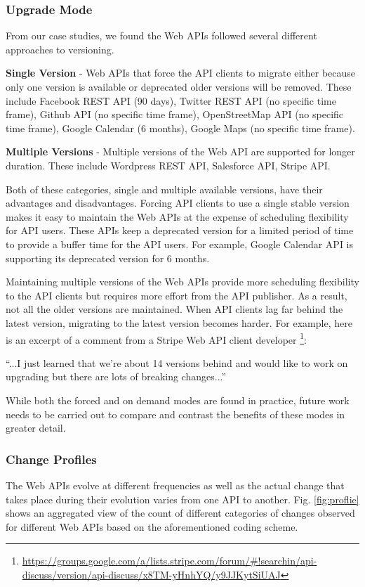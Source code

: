 \subsubsection{Upgrade Mode} %

From our case studies, we found the Web APIs followed several different approaches to versioning.

\textbf{Single Version} - Web APIs that force the API clients to migrate either because only one version is available or deprecated older versions will be removed. These include Facebook REST API (90 days), Twitter REST API (no specific time frame), Github API (no specific time frame), OpenStreetMap API (no specific time frame), Google Calendar (6 months), Google Maps (no specific time frame).

\textbf{Multiple Versions} - Multiple versions of the Web API are supported for longer duration. These include Wordpress REST API, Salesforce API, Stripe API.

Both of these categories, single and multiple available versions, have their advantages and disadvantages. Forcing API clients to use a single stable version makes it easy to maintain the Web APIs at the expense of scheduling flexibility for API users. These APIs keep a deprecated version for a limited period of time to provide a buffer time for the API users. For example, Google Calendar API is supporting its deprecated version for 6 months.

Maintaining multiple versions of the Web APIs provide more scheduling flexibility to the API clients but requires more effort from the API publisher. As a result, not all the older versions are maintained. When API clients lag far behind the latest version, migrating to the latest version becomes harder. For example, here is an excerpt of a comment from a Stripe Web API client developer \footnote{\url{https://groups.google.com/a/lists.stripe.com/forum/\#!searchin/api-discuss/version/api-discuss/x8TM-yHnhYQ/y9JJKytSiUAJ}}:

\small
``...I just learned that we're about 14 versions behind and would like to work on upgrading but there are lots of breaking changes...''
\normalsize

While both the forced and on demand modes are found in practice, future work needs to be carried out to compare and contrast the benefits of these modes in greater detail.




\subsubsection{Change Profiles}
The Web APIs evolve at different frequencies as well as the actual change that takes place during their evolution varies from one API to another. Fig. \ref{fig:proflie} shows an aggregated view of the count of different categories of changes observed for different Web APIs based on the aforementioned coding scheme.


